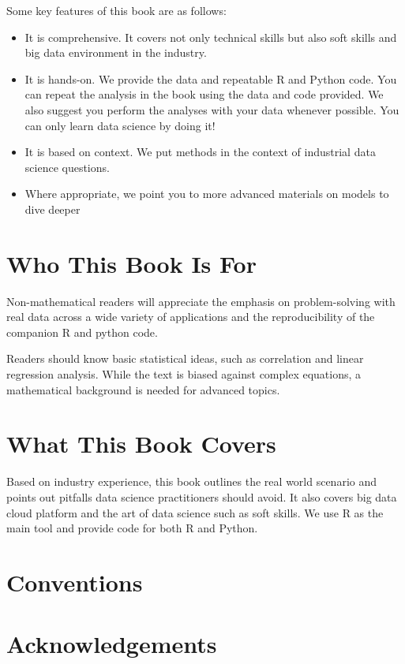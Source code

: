 \documentclass[12pt,]{krantz}
\theoremstyle{definition}
\theoremstyle{definition}
\theoremstyle{definition}
\theoremstyle{remark}
\begin{document}
Some key features of this book are as follows:

\begin{itemize}
\item
  It is comprehensive. It covers not only technical skills but also soft
  skills and big data environment in the industry.
\item
  It is hands-on. We provide the data and repeatable R and Python code.
  You can repeat the analysis in the book using the data and code
  provided. We also suggest you perform the analyses with your data
  whenever possible. You can only learn data science by doing it!
\item
  It is based on context. We put methods in the context of industrial
  data science questions.
\item
  Where appropriate, we point you to more advanced materials on models
  to dive deeper
\end{itemize}

\section*{Who This Book Is For}\label{who-this-book-is-for}


Non-mathematical readers will appreciate the emphasis on problem-solving
with real data across a wide variety of applications and the
reproducibility of the companion R and python code.

Readers should know basic statistical ideas, such as correlation and
linear regression analysis. While the text is biased against complex
equations, a mathematical background is needed for advanced topics.

\section*{What This Book Covers}\label{what-this-book-covers}


Based on industry experience, this book outlines the real world scenario
and points out pitfalls data science practitioners should avoid. It also
covers big data cloud platform and the art of data science such as soft
skills. We use R as the main tool and provide code for both R and
Python.

\section*{Conventions}\label{conventions}


\section*{Acknowledgements}\label{acknowledgements}
\end{document}

